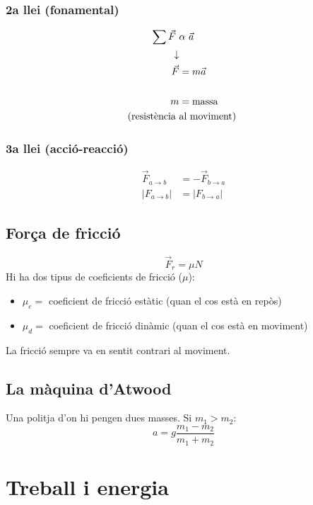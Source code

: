 \subsubsection{2a llei (fonamental)}
\begin{align}
    \sum \vec{F}\ &\alpha\ \vec{a} \notag \\
    \downarrow & \notag \\
    \vec{F} &= m  \vec{a} \\ 
    \notag \\
    m &= \text{massa} \notag \\
    \text{(resistència }&\text{al moviment) }\notag
\end{align}

\subsubsection{3a llei (acció-reacció)}
\begin{align*}
    \vec{F}_{a \rightarrow b} &= -\vec{F}_{b \rightarrow a} \\
    |F_{a \rightarrow b}| &= |F_{b \rightarrow a}|
\end{align*}

\subsection{Força de fricció}

\begin{equation}
    \vec{F}_r = \mu  N
\end{equation}
Hi ha dos tipus de coeficients de fricció ($\mu$):
\begin{itemize}
    \item $\mu _e = $ coeficient de fricció estàtic (quan el cos està en repòs)
    \item $\mu _d = $ coeficient de fricció dinàmic (quan el cos està en moviment)
\end{itemize}
La fricció sempre va en sentit contrari al moviment.


\subsection{La màquina d'Atwood}
Una politja d'on hi pengen dues masses. Si $m_1 > m_2$:
\begin{equation}
    a = g\frac{m_1-m_2}{m_1+m_2}
\end{equation} 

\section{Treball i energia}

